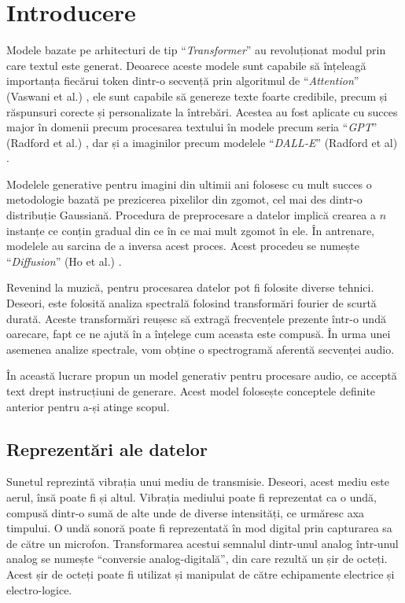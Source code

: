 \chapter*{Introducere} 

Modele bazate pe arhitecturi de tip ``\textit{Transformer}'' au revoluționat modul prin care textul este generat. Deoarece aceste modele sunt capabile să înțeleagă importanța fiecărui token dintr-o secvență prin algoritmul de ``\textit{Attention}'' (Vaswani et al.) \cite{vaswani2023attentionneed}, ele sunt capabile să genereze texte foarte credibile, precum și răspunsuri corecte și personalizate la întrebări. Acestea au fost aplicate cu succes major în domenii precum procesarea textului în modele precum seria ``\textit{GPT}'' (Radford et al.) \cite{radford2018improving}, dar și a imaginilor precum modelele ``\textit{DALL-E}'' (Radford et al) \cite{ramesh2021zeroshottexttoimagegeneration}.

Modelele generative pentru imagini din ultimii ani folosesc cu mult succes o metodologie bazată pe prezicerea pixelilor din zgomot, cel mai des dintr-o distribuție Gaussiană. Procedura de preprocesare a datelor implică crearea a $n$ instanțe ce conțin gradual din ce în ce mai mult zgomot în ele. În antrenare, modelele au sarcina de a inversa acest proces. Acest procedeu se numește ``\textit{Diffusion}'' (Ho et al.) \cite{ho2020denoisingdiffusionprobabilisticmodels}.

Revenind la muzică, pentru procesarea datelor pot fi folosite diverse tehnici. Deseori, este folosită analiza spectrală folosind transformări fourier de scurtă durată. Aceste transformări reușesc să extragă frecvențele prezente într-o undă oarecare, fapt ce ne ajută în a înțelege cum aceasta este compusă. În urma unei asemenea analize spectrale, vom obține o spectrogramă aferentă secvenței audio.

În această lucrare propun un model generativ pentru procesare audio, ce acceptă text drept instrucțiuni de generare. Acest model folosește conceptele definite anterior pentru a-și atinge scopul.

\section{Reprezentări ale datelor}

Sunetul reprezintă vibrația unui mediu de transmisie. Deseori, acest mediu este aerul, însă poate fi și altul. Vibrația mediului poate fi reprezentat ca o undă, compusă dintr-o sumă de alte unde de diverse intensități, ce urmăresc axa timpului. O undă sonoră poate fi reprezentată în mod digital prin capturarea sa de către un microfon. Transformarea acestui semnalul dintr-unul analog într-unul analog se numește ``conversie analog-digitală'', din care rezultă un șir de octeți. Acest șir de octeți poate fi utilizat și manipulat de către echipamente electrice și electro-logice.

